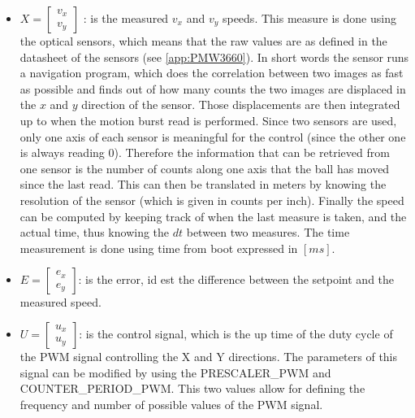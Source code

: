 \documentclass[12pt,a4paper, twoside]{article}
\begin{document}
\begin{itemize}
	\item 
	$X = \begin{bmatrix}
	v_x\\
	v_y
	\end{bmatrix}$
	: is the measured $v_x$ and $v_y$ speeds. This measure is done using the optical sensors, which means that the raw values are as defined in the datasheet of the sensors (see \ref{app:PMW3660}). In short words the sensor runs a navigation program, which does the correlation between two images as fast as possible and finds out of how many counts the two images are displaced in the $x$ and $y$ direction of the sensor. Those displacements are then integrated up to when the motion burst read is performed. Since two sensors are used, only one axis of each sensor is meaningful for the control (since the other one is always reading 0). Therefore the information that can be retrieved from one sensor is the number of counts along one axis that the ball has moved since the last read. This can then be translated in meters by knowing the resolution of the sensor (which is given in counts per inch). Finally the speed can be computed by keeping track of when the last measure is taken, and the actual time, thus knowing the $dt$ between two measures. The time measurement is done using time from boot expressed in $[ms]$.
	\item	
	$E = \begin{bmatrix}
	e_x\\
	e_y
	\end{bmatrix}$: is the error, id est the difference between the setpoint and the measured speed.
	\item  
	$U = 
	\begin{bmatrix}
		u_x\\
		u_y
	\end{bmatrix}$: is the control signal, which is the up time of the duty cycle of the PWM signal controlling the X and Y directions. The parameters of this signal can be modified by using the PRESCALER\_PWM and COUNTER\_PERIOD\_PWM. This two values allow for defining the frequency and number of possible values of the PWM signal.
\end{itemize}
\end{document}
